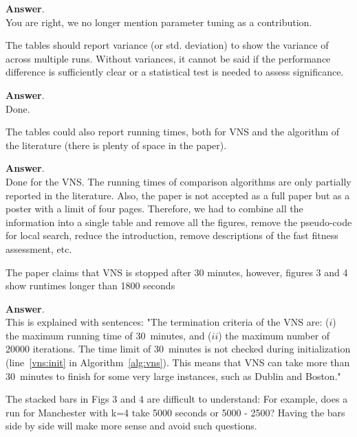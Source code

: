 \documentclass [11pt]{scrartcl}
\begin{document}
\textbf{Answer}. \\
You are right, we no longer mention parameter tuning as a contribution.
 

\begin{leftbar}
The tables should report variance (or std. deviation) to show the variance of across multiple runs. Without variances, it cannot be said if the performance difference is sufficiently clear or a statistical test is needed to assess significance.
\end{leftbar}

\textbf{Answer}. \\
Done.

\begin{leftbar}
The tables could also report running times, both for VNS and the algorithm of the literature (there is plenty of space in the paper).
\end{leftbar}

\textbf{Answer}.\\
Done for the VNS. 
The running times of comparison algorithms are only partially reported in the literature.
Also, the paper is not accepted as a full paper but as a poster with a limit of four pages.
Therefore, we had to combine all the information into a single table and remove all the figures, remove the pseudo-code for local search, reduce the introduction, remove descriptions of the fast fitness assessment, etc.

\begin{leftbar}
The paper claims that VNS is stopped after 30 minutes, however, figures 3 and 4 show runtimes longer than 1800 seconds
\end{leftbar}

\textbf{Answer}. \\
This is explained with sentences:
"The termination criteria of the VNS are: ($i$) the maximum running time of 30~minutes, and ($ii$) the maximum number of 20000 iterations. The time limit of 30~minutes is not checked during initialization (line~\ref{vns:init} in Algorithm~\ref{alg:vns}). This means that VNS can take more than 30~minutes to finish for some very large instances, such as Dublin and Boston."

\begin{leftbar}
The stacked bars in Figs 3 and 4 are difficult to understand: For example, does a run for Manchester with k=4 take 5000 seconds or 5000 - 2500? Having the bars side by side will make more sense and avoid such questions.	
\end{leftbar}
\end{document}
